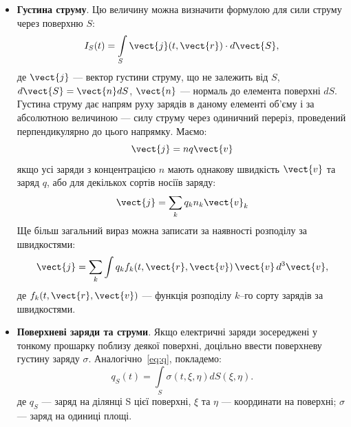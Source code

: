 \begin{itemize}
	\item \textbf{Густина струму}. Цю величину можна визначити формулою для сили струму через
	      поверхню $S$:
	      \begin{equation}
		      I_S(t) = \int\limits_S \vect{j}(t, \vect{r})\cdot d\vect{S},
	      \end{equation}
	      де $\vect{j}$ --- вектор густини струму, що не залежить від $S$, $d\vect{S} = \vect{n}
		      dS$, $\vect{n}$ --- нормаль до елемента поверхні $dS$. Густина струму дає напрям руху зарядів в
		      даному елементі об'єму і за абсолютною величиною --- силу струму через одиничний переріз, проведений
		      перпендикулярно до цього напрямку. Маємо:
	      \begin{equation}
		      \vect{j} = nq\vect{v}
	      \end{equation}
	      якщо усі заряди з концентрацією $n$ мають однакову швидкість $\vect{v}$ та заряд $q$, або для декількох сортів
	      носіїв заряду:
	      \begin{equation}
		      \vect{j} = \sum\limits_k q_k n_k\vect{v}_k
	      \end{equation}
	      Ще більш загальний вираз можна записати за наявності розподілу за швидкостями:
	      \begin{equation}
		      \vect{j} = \sum\limits_k \int  q_k f_k(t, \vect{r}, \vect{v})\, \vect{v}\, d^3\vect{v},
	      \end{equation}
	      де $f_k(t, \vect{r}, \vect{v})$ --- функція розподілу $k$–го сорту зарядів за
	      швидкостями.


	\item \textbf{Поверхневі заряди та струми}.  Якщо електричні заряди зосереджені у тонкому
	      прошарку поблизу деякої поверхні, доцільно ввести поверхневу густину заряду $\sigma$.
	      Аналогічно~\eqref{eq:q}, покладемо:
	      \begin{equation}
		      q_S(t) = \int\limits_S \sigma(t, \xi, \eta) dS(\xi, \eta).
	      \end{equation}
	      де $q_S$ --- заряд на ділянці S цієї поверхні, $\xi$ та $\eta$ --- координати на поверхні; $\sigma$ --- заряд
	      на одиниці площі.



\end{itemize}
